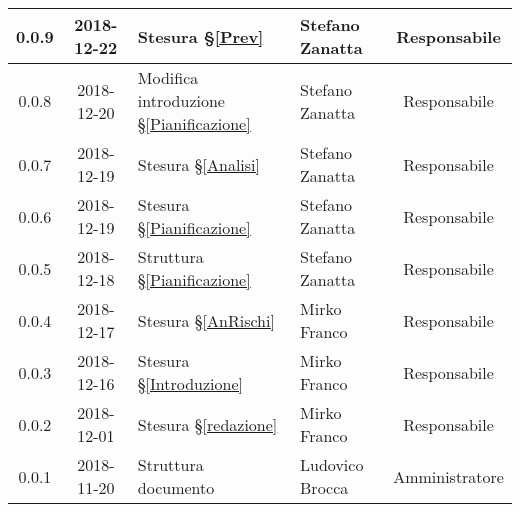 \begin{center}
\begin{tabularx}{\textwidth}{|c|c|X|X|c|}
			\hline
			0.0.9 & 2018-12-22 & Stesura \S\ref{Prev} & Stefano Zanatta & Responsabile\\
			\hline
			0.0.8 & 2018-12-20 & Modifica introduzione \S\ref{Pianificazione} & Stefano Zanatta & Responsabile\\
			\hline
			0.0.7 & 2018-12-19 & Stesura \S\ref{Analisi}& Stefano Zanatta & Responsabile\\
			\hline
			0.0.6 & 2018-12-19 & Stesura \S\ref{Pianificazione} & Stefano Zanatta & Responsabile\\
			\hline
			0.0.5 & 2018-12-18 & Struttura \S\ref{Pianificazione} & Stefano Zanatta & Responsabile\\
			\hline
			0.0.4 & 2018-12-17 & Stesura \S\ref{AnRischi} & Mirko Franco & Responsabile\\
			\hline
			0.0.3 & 2018-12-16 & Stesura \S\ref{Introduzione} & Mirko Franco& Responsabile\\
			\hline
			0.0.2 & 2018-12-01 & Stesura \S\ref{redazione} & Mirko Franco& Responsabile\\
			\hline
			0.0.1 & 2018-11-20 & Struttura documento & Ludovico Brocca & Amministratore\\			
			\hline
			
		\end{tabularx}
	\end{center}
\newpage